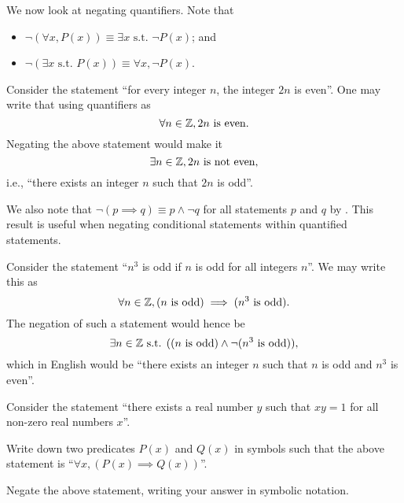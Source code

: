 We now look at negating quantifiers. Note that
\begin{itemize}
    \item $\lnot(\forall x, P(x)) \equiv \exists x \text{ s.t. } \lnot P(x)$; and
    \item $\lnot(\exists x \text{ s.t. } P(x)) \equiv \forall x, \lnot P(x)$.
\end{itemize}

\begin{example}
    Consider the statement ``for every integer $n$, the integer $2n$ is even''. One may write that using quantifiers as
    \[
        \forall n \in\mathbb{Z}, 2n \text{ is even}.
    \]
    Negating the above statement would make it
    \[
        \exists n \in \mathbb{Z}, 2n \text{ is not even},
    \]
    i.e., ``there exists an integer $n$ such that $2n$ is odd''.
\end{example}

We also note that $\lnot(p \implies q) \equiv p \land \lnot q$ for all statements $p$ and $q$ by . This result is useful when negating conditional statements within quantified statements.

\begin{example}
    Consider the statement ``$n^3$ is odd if $n$ is odd for all integers $n$''. We may write this as
    \[
        \forall n \in \mathbb{Z}, (n \text{ is odd}) \implies (n^3 \text{ is odd}).
    \]
    The negation of such a statement would hence be
    \[
        \exists n \in \mathbb{Z} \text{ s.t. }((n \text{ is odd}) \land \lnot(n^3 \text{ is odd})),
    \]
    which in English would be ``there exists an integer $n$ such that $n$ is odd and $n^3$ is even''.
\end{example}

\begin{exercise}
    Consider the statement ``there exists a real number $y$ such that $xy = 1$ for all non-zero real numbers $x$''.
    \begin{partquestions}{\roman*}
        \item Write down two predicates $P(x)$ and $Q(x)$ in symbols such that the above statement is ``$\forall x,(P(x) \implies Q(x))$''.
        \item Negate the above statement, writing your answer in symbolic notation.
    \end{partquestions}
\end{exercise}

